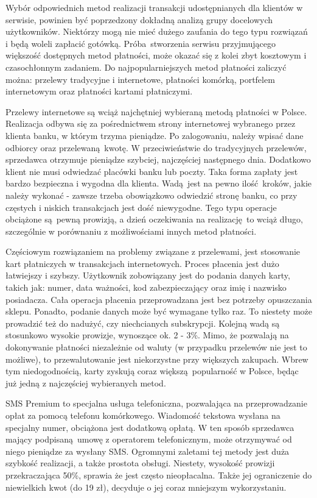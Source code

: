 Wybór odpowiednich metod realizacji transakcji udostępnianych dla klientów w 
serwisie, powinien być poprzedzony dokładną analizą grupy docelowych 
użytkowników. Niektórzy mogą nie mieć dużego zaufania do tego typu rozwiązań i 
będą woleli zapłacić gotówką. Próba stworzenia serwisu przyjmującego większość 
dostępnych metod płatności, może okazać się z kolei zbyt kosztowym i 
czasochłonnym zadaniem. Do najpopularniejszych metod płatności zaliczyć można: 
przelewy tradycyjne i internetowe, płatności komórką, portfelem internetowym 
oraz płatności kartami płatniczymi.

Przelewy internetowe są wciąż najchętniej wybieraną metodą płatności w Polsce. 
Realizacja odbywa się za pośrednictwem strony internetowej wybranego przez 
klienta banku, w którym trzyma pieniądze. Po zalogowaniu, należy wpisać dane 
odbiorcy oraz przelewaną kwotę. W przeciwieństwie do tradycyjnych przelewów, 
sprzedawca otrzymuje pieniądze szybciej, najczęściej następnego dnia. Dodatkowo 
klient nie musi odwiedzać placówki banku lub poczty. Taka forma zapłaty jest 
bardzo bezpieczna i wygodna dla klienta. Wadą jest na pewno ilość kroków, jakie 
należy wykonać - zawsze trzeba obowiązkowo odwiedzić stronę banku, co przy 
częstych i niskich transakcjach jest dość niewygodne. Tego typu operacje 
obciążone są pewną prowizją, a dzień oczekiwania na realizację to wciąż długo, 
szczególnie w porównaniu z możliwościami innych metod płatności.

Częściowym rozwiązaniem na problemy związane z przelewami, jest stosowanie kart 
płatniczych w transakcjach internetowych. Proces płacenia jest dużo łatwiejszy 
i szybszy. Użytkownik zobowiązany jest do podania danych karty, takich jak: 
numer, data ważności, kod zabezpieczający oraz imię i nazwisko posiadacza. Cała 
operacja płacenia przeprowadzana jest bez potrzeby opuszczania sklepu. Ponadto, 
podanie danych może być wymagane tylko raz. To niestety może prowadzić też do 
nadużyć, czy niechcianych subskrypcji. Kolejną wadą są stosunkowo wysokie 
prowizje, wynoszące ok. 2 - 3\%. Mimo, że pozwalają na dokonywanie płatności 
niezależnie od waluty (w przypadku przelewów nie jest to możliwe), to 
przewalutowanie jest niekorzystne przy większych zakupach. Wbrew tym 
niedogodnością, karty zyskują coraz większą popularność w Polsce, będąc już 
jedną z najczęściej wybieranych metod.

SMS Premium to specjalna usługa telefoniczna, pozwalająca na przeprowadzanie 
opłat za pomocą telefonu komórkowego. Wiadomość tekstowa wysłana na 
specjalny numer, obciążona jest dodatkową opłatą. W ten sposób sprzedawca 
mający podpisaną umowę z operatorem telefonicznym, może otrzymywać od niego 
pieniądze za wysłany SMS. Ogromnymi zaletami tej metody jest duża szybkość 
realizacji, a także prostota obsługi. Niestety, wysokość prowizji 
przekraczająca 50\%, sprawia że jest często nieopłacalna. Także jej 
ograniczenie do niewielkich kwot (do 19 zł), decyduje o jej coraz 
mniejszym wykorzystaniu.

